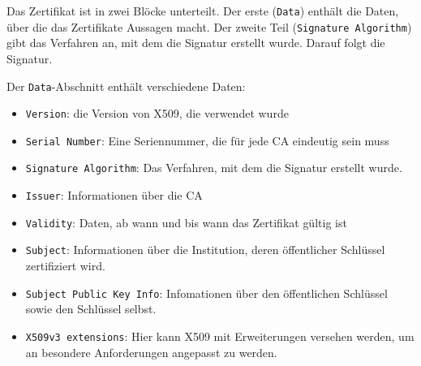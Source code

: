 Das Zertifikat ist in zwei Blöcke unterteilt. Der erste (\texttt{Data})
enthält die Daten, über die das Zertifikate Aussagen macht. Der zweite
Teil (\texttt{Signature Algorithm}) gibt das Verfahren an, mit dem die
Signatur erstellt wurde. Darauf folgt die Signatur.

Der \texttt{Data}-Abschnitt enthält verschiedene Daten:
\begin{itemize}
\item \texttt{Version}: die Version von X509, die verwendet wurde
\item \texttt{Serial Number}: Eine Seriennummer, die für jede CA
  eindeutig sein muss
\item \texttt{Signature Algorithm}: Das Verfahren, mit dem die Signatur
  erstellt wurde.
\item \texttt{Issuer}: Informationen über die CA
\item \texttt{Validity}: Daten, ab wann und bis wann das Zertifikat
  gültig ist
\item \texttt{Subject}: Informationen über die Institution, deren
  öffentlicher Schlüssel zertifiziert wird.
\item \texttt{Subject Public Key Info}: Infomationen über den
  öffentlichen Schlüssel sowie den Schlüssel selbst.
\item \texttt{X509v3 extensions}: Hier kann X509 mit Erweiterungen
  versehen werden, um an besondere Anforderungen angepasst zu werden.
\end{itemize}
